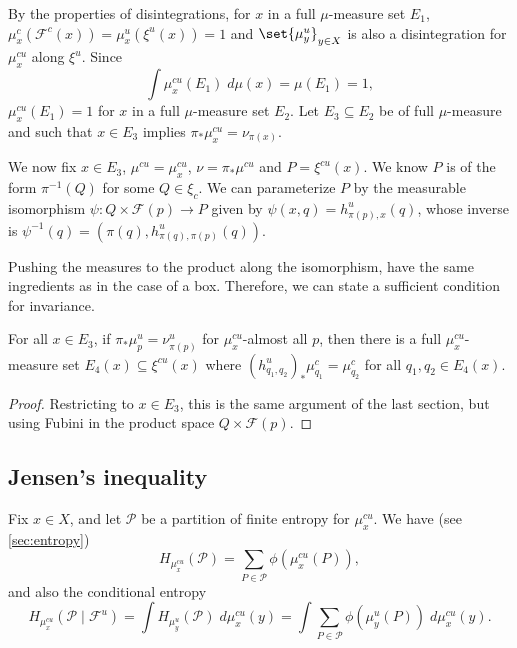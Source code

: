 \documentclass[../main]{subfiles}
\begin{document}
By the properties of disintegrations, for \(x\) in a full \(\mu\)-measure set \(E_1\), \(\mu^{c}_x(\mathcal{F}^{c}(x)) = \mu^u_x(\xi^u(x)) = 1\) and \(\set{\mu^u_y}_{y \in X}\) is also a disintegration for \(\mu^{cu}_x\) along \(\xi^u\). Since
\begin{equation*}
  \int \mu_x^{cu}(E_1) \;d\mu(x) = \mu(E_1) = 1,
\end{equation*}
\(\mu_x^{cu}(E_1) = 1\) for \(x\) in a full \(\mu\)-measure set \(E_2\). Let \(E_3 \subseteq E_2\) be of full \(\mu\)-measure and such that \(x \in E_3\) implies \(\pi_*\mu^{cu}_x = \nu_{\pi(x)}\).

We now fix \(x \in E_3\), \(\mu^{cu} = \mu^{cu}_x\), \(\nu = \pi_*\mu^{cu}\) and \(P = \xi^{cu}(x)\). We know \(P\) is of the form \(\pi ^{-1}(Q)\) for some \(Q \in \xi_c\). We can parameterize \(P\) by the measurable isomorphism \(\psi \colon Q \times \mathcal{F}(p) \to P\) given by \(\psi(x,q) = h^u_{\pi(p), x}(q)\), whose inverse is \(\psi ^{-1}(q) = (\pi(q),h^u_{\pi(q),\pi(p)}(q))\).

Pushing the measures to the product along the isomorphism, have the same ingredients as in the case of a box. Therefore, we can state a sufficient condition for invariance.

\begin{lemma}\label{lem:proj-implies-invariance}
  For all \(x \in E_3\), if \(\pi_* \mu^u_p = \nu_{\pi(p)}^u\) for \(\mu_x^{cu}\)-almost all \(p\), then there is a full \(\mu_x^{cu}\)-measure set \(E_4(x) \subseteq \xi^{cu}(x)\) where \((h^u_{q_1,q_2})_*\mu^c_{q_1} = \mu^c_{q_2}\) for all \(q_1,q_2 \in E_4(x)\).
\end{lemma}

\begin{proof}
  Restricting to \(x \in E_3\), this is the same argument of the last section, but using Fubini in the product space \(Q \times \mathcal{F}(p)\).
\end{proof}

\subsection{Jensen's inequality}\label{sec:jensens-inequality}

Fix \(x \in X\), and let \(\mathcal{P}\) be a partition of finite entropy for \(\mu^{cu}_x\). We have (see \cref{sec:entropy})
\begin{equation*}
  H_{\mu_x^{cu}}(\mathcal{P}) = \sum_{P \in \mathcal{P}} \phi(\mu_x^{cu}(P)),
\end{equation*}
and also the conditional entropy
\begin{equation*}
  H_{\mu_x^{cu}}(\mathcal{P} \mid \mathcal{F}^u)
  = \int H_{\mu^{u}_y}(\mathcal{P}) \;d\mu_x^{cu}(y)
  = \int \sum_{P \in \mathcal{P}} \phi(\mu_y^{u}(P)) \;d\mu_x^{cu}(y).
\end{equation*}
\end{document}
